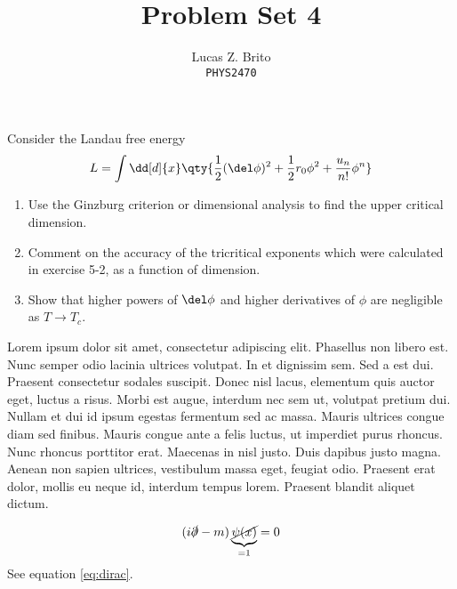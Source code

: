 \documentclass{article}
\title{\textbf{\textsf{Problem Set 4}}}
\author{Lucas Z. Brito\\\texttt{PHYS2470}}
\begin{document}
\maketitle
{}
\begin{qbox}
	Consider the Landau free energy 
	\begin{equation*}
		L = \int \dd[d]{x} \qty{ 
			\frac{1}{2}(\del\phi)^2 + \frac{1}{2}r_0\phi^2 
			+ \frac{u_n}{n!}\phi^n
		 }
	\end{equation*}
	\begin{enumerate}[label=\alph*)]
	\item Use the Ginzburg criterion or dimensional analysis to 
		find the upper critical dimension.
	\item Comment on the accuracy of the tricritical exponents 
		which were calculated in exercise 5-2, as a function of dimension.
	\item Show that higher powers of $ \del\phi $ and higher derivatives 
		of $ \phi $ are negligible as $ T\rightarrow T_c $.
	\end{enumerate}
\end{qbox}

\solution
Lorem ipsum dolor sit amet, consectetur adipiscing elit. Phasellus non libero
est. Nunc semper odio lacinia ultrices volutpat. In et dignissim sem. Sed a est
dui. Praesent consectetur sodales suscipit. Donec nisl lacus, elementum quis
auctor eget, luctus a risus. Morbi est augue, interdum nec sem ut, volutpat
pretium dui. Nullam et dui id ipsum egestas fermentum sed ac massa. Mauris
ultrices congue diam sed finibus. Mauris congue ante a felis luctus, ut
imperdiet purus rhoncus. Nunc rhoncus porttitor erat. Maecenas in nisl justo.
Duis dapibus justo magna. Aenean non sapien ultrices, vestibulum massa eget,
feugiat odio. Praesent erat dolor, mollis eu neque id, interdum tempus lorem.
Praesent blandit aliquet dictum.  

\begin{equation}\label{eq:dirac}
(i\slashed{\partial} -m )\underbrace{\cancel{\psi(x)}}_{\text{=1}} = 0
\end{equation}
See equation \eqref{eq:dirac}. 
\end{document}
